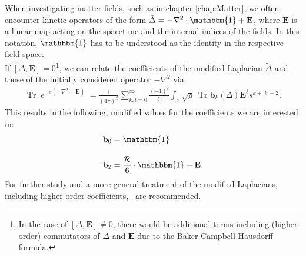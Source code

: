 When investigating matter fields, such as in chapter \ref{chap:Matter}, we often encounter kinetic operators of the form $\tilde{\Delta} = -\nabla^2\cdot\mathbbm{1} +  \mathbf{E}$, where $\mathbf{E}$ is a linear map acting on the spacetime and the internal indices of the fields. In this notation, $\mathbbm{1}$ has to be understood as the identity in the respective field space. \\
If $\left[\Delta, \mathbf{E}\right] = 0$\footnote{In the case of $\left[\Delta, \mathbf{E}\right] \neq 0$, there would be additional terms including (higher order) commutators of $\Delta$ and $\mathbf{E}$ due to the Baker-Campbell-Hausdorff formula.}, we can relate the coefficients of the modified Laplacian $\tilde{\Delta}$ and those of the initially considered operator $-\nabla^2$ via
\begin{align}
	\operatorname{Tr} \operatorname{e}^{-s\left(-\nabla^{2}+\mathbf{E}\right)}=\frac{1}{(4 \pi)^{\frac{d}{2}}} \sum_{k, l=0}^{\infty} \frac{(-1)^{\ell}}{\ell !} \int_x \sqrt{g} \ \operatorname{Tr} \mathbf{b}_{k}(\Delta) \mathbf{E}^{\ell} s^{k+\ell-2}.
\end{align}
This results in the following, modified values for the coefficients we are interested in:
\begin{align}
	\mathbf{b}_0 &= \mathbbm{1} \\[10pt]
	\mathbf{b}_2 &= \frac{\mathcal{R}}{6}\cdot\mathbbm{1} - \mathbf{E}.
\end{align} 
For further study and a more general treatment of the modified Laplacians, including higher order coefficients,\ \cite{CodelloPercacciRahmede2008, Percacci2017} are recommended.